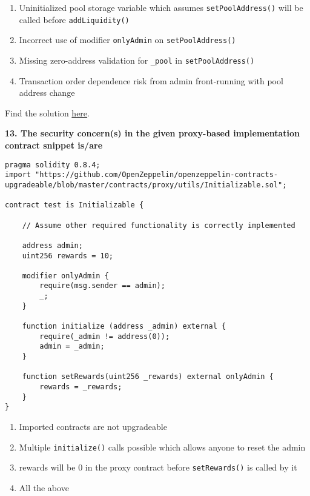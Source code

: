 \begin{enumerate}[label=\Alph*.]
    \item Uninitialized pool storage variable which assumes \verb|setPoolAddress()| will be called before \verb|addLiquidity()|
    \item Incorrect use of modifier \verb|onlyAdmin| on \verb|setPoolAddress()|
    \item Missing zero-address validation for \verb|_pool| in \verb|setPoolAddress()|
    \item Transaction order dependence risk from admin front-running with pool address change
\end{enumerate}

Find the solution \hyperref[sec:exam4_q12]{here}.\\

\pagebreak

\textbf{13. The security concern(s) in the given proxy-based implementation contract snippet is/are}

\begin{lstlisting}[language=Solidity, style=solStyle]
pragma solidity 0.8.4;
import "https://github.com/OpenZeppelin/openzeppelin-contracts-upgradeable/blob/master/contracts/proxy/utils/Initializable.sol";

contract test is Initializable {

    // Assume other required functionality is correctly implemented

    address admin;
    uint256 rewards = 10;

    modifier onlyAdmin {
        require(msg.sender == admin);
        _;
    }

    function initialize (address _admin) external {
        require(_admin != address(0));
        admin = _admin;
    }

    function setRewards(uint256 _rewards) external onlyAdmin {
        rewards = _rewards;
    }
}
\end{lstlisting}

\begin{enumerate}[label=\Alph*.]
    \item Imported contracts are not upgradeable
    \item Multiple \verb|initialize()| calls possible which allows anyone to reset the admin
    \item rewards will be 0 in the proxy contract before \verb|setRewards()| is called by it
    \item All the above
\end{enumerate}


